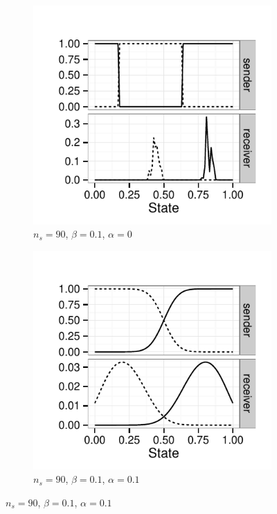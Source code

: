 \documentclass[fleqn,reqno,10pt]{article}
\newcommand{\impairment}{\ensuremath{\alpha}} %
\newcommand{\toler}{\ensuremath{\beta}} %
\newcommand{\ns}{\ensuremath{n_s}} %
\begin{document}
\begin{figure}
  \centering

  \begin{subfigure}[]{0.45\textwidth}
    \includegraphics[width=\textwidth]{plots/strat_example_ind3098.pdf}
    \caption{$\ns = 90$, $\toler = 0.1$, $\impairment = 0$}
    \label{fig:example_stratsA}
  \end{subfigure}
  \hfill
  \begin{subfigure}[]{0.45\textwidth}
    \includegraphics[width=\textwidth]{plots/strat_example_ind3452.pdf}
    \caption{$\ns = 90$, $\toler = 0.1$, $\impairment = 0.1$}
    \label{fig:example_stratsB}
  \end{subfigure}


\end{figure}
\end{document}
